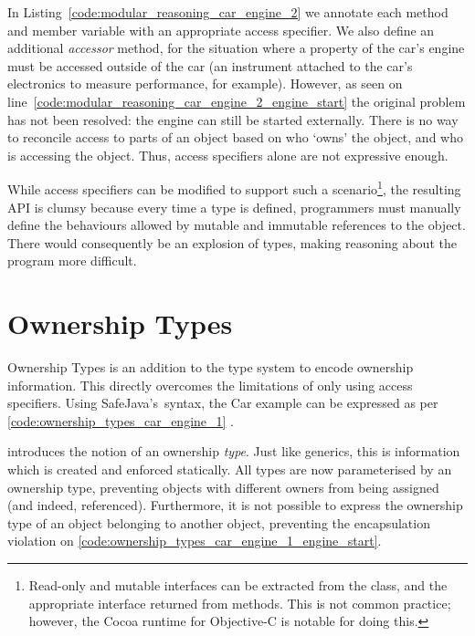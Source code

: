\documentclass{acm_proc_article-sp}
\begin{document}
In Listing~\ref{code:modular_reasoning_car_engine_2} we annotate each method 
and member variable with an appropriate access specifier. We also define an 
additional \emph{accessor} method, for the situation where a property of the 
car's engine must be accessed outside of the car (an instrument attached to the 
car's electronics to measure performance, for example). However, as seen on 
line~\ref{code:modular_reasoning_car_engine_2_engine_start} the original 
problem has not been resolved: the engine can still be started externally. 
There is no way to reconcile access to parts of an object based on who `owns' 
the object, and who is accessing the object. Thus, access specifiers alone are 
not expressive enough.

While access specifiers can be modified to support such a 
scenario\footnote{Read-only and mutable interfaces can be extracted from the 
class, and the appropriate interface returned from methods. This is not common 
practice; however, the Cocoa runtime for Objective-C is notable for doing 
this.}, the resulting API is clumsy because every time a type is defined, 
programmers must manually define the behaviours allowed by mutable and 
immutable references to the object. There would consequently be an explosion of 
types, making reasoning about the program more difficult.

\section{Ownership Types}
\label{sec:ownership}

Ownership Types is an addition to the type system to encode ownership 
information. This directly overcomes the limitations of only using access 
specifiers. Using SafeJava's\,\cite{boyapati04safejava} syntax, the Car example 
can be expressed as per \cref{code:ownership_types_car_engine_1} 
.

 introduces the notion of an ownership 
\emph{type}. Just like generics, this is information which is created and 
enforced statically. All types are now parameterised by an ownership type, 
preventing objects with different owners from being assigned (and indeed, 
referenced). Furthermore, it is not possible to express the ownership type of 
an object belonging to another object, preventing the encapsulation violation 
on \cref{code:ownership_types_car_engine_1_engine_start}.
\end{document}
